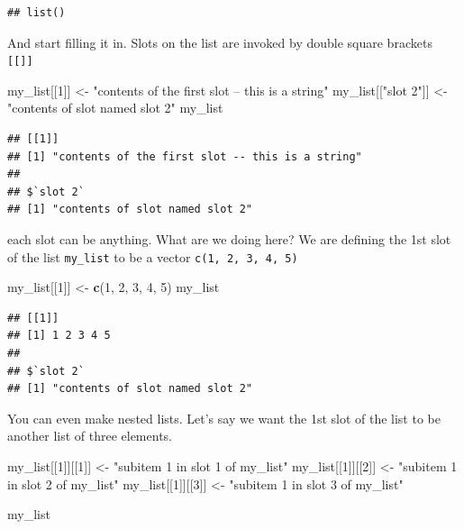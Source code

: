 \documentclass[]{book}
\newenvironment{Shaded}{\begin{snugshade}}{\end{snugshade}}
\newcommand{\DecValTok}[1]{\textcolor[rgb]{0.00,0.00,0.81}{#1}}
\newcommand{\KeywordTok}[1]{\textcolor[rgb]{0.13,0.29,0.53}{\textbf{#1}}}
\newcommand{\NormalTok}[1]{#1}
\newcommand{\StringTok}[1]{\textcolor[rgb]{0.31,0.60,0.02}{#1}}
\theoremstyle{definition}
\theoremstyle{definition}
\theoremstyle{definition}
\theoremstyle{remark}
\begin{document}
\begin{verbatim}
## list()
\end{verbatim}

And start filling it in. Slots on the list are invoked by double square brackets \texttt{{[}{[}{]}{]}}

\begin{Shaded}
\begin{Highlighting}[]
\NormalTok{my_list[[}\DecValTok{1}\NormalTok{]] <-}\StringTok{ "contents of the first slot -- this is a string"}
\NormalTok{my_list[[}\StringTok{"slot 2"}\NormalTok{]] <-}\StringTok{ "contents of slot named slot 2"}
\NormalTok{my_list}
\end{Highlighting}
\end{Shaded}

\begin{verbatim}
## [[1]]
## [1] "contents of the first slot -- this is a string"
## 
## $`slot 2`
## [1] "contents of slot named slot 2"
\end{verbatim}

each slot can be anything. What are we doing here? We are defining the 1st slot of the list \texttt{my\_list} to be a vector \texttt{c(1,\ 2,\ 3,\ 4,\ 5)}

\begin{Shaded}
\begin{Highlighting}[]
\NormalTok{my_list[[}\DecValTok{1}\NormalTok{]] <-}\StringTok{ }\KeywordTok{c}\NormalTok{(}\DecValTok{1}\NormalTok{, }\DecValTok{2}\NormalTok{, }\DecValTok{3}\NormalTok{, }\DecValTok{4}\NormalTok{, }\DecValTok{5}\NormalTok{)}
\NormalTok{my_list}
\end{Highlighting}
\end{Shaded}

\begin{verbatim}
## [[1]]
## [1] 1 2 3 4 5
## 
## $`slot 2`
## [1] "contents of slot named slot 2"
\end{verbatim}

You can even make nested lists. Let's say we want the 1st slot of the list to be another list of three elements.

\begin{Shaded}
\begin{Highlighting}[]
\NormalTok{my_list[[}\DecValTok{1}\NormalTok{]][[}\DecValTok{1}\NormalTok{]] <-}\StringTok{ "subitem 1 in slot 1 of my_list"}
\NormalTok{my_list[[}\DecValTok{1}\NormalTok{]][[}\DecValTok{2}\NormalTok{]] <-}\StringTok{ "subitem 1 in slot 2 of my_list"}
\NormalTok{my_list[[}\DecValTok{1}\NormalTok{]][[}\DecValTok{3}\NormalTok{]] <-}\StringTok{ "subitem 1 in slot 3 of my_list"}

\NormalTok{my_list}
\end{Highlighting}
\end{Shaded}
\end{document}
